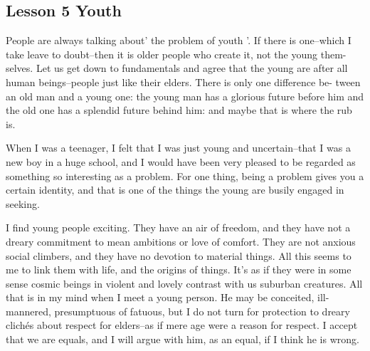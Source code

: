 \documentclass[kindlepaper]{BHCexam4kindle}
\begin{document}
\subsection{Lesson 5
Youth}
\par
People are always talking about' the problem of youth '. If there is one--which
I take leave to doubt--then it is older people who create it, not the young them-
selves. Let us get down to fundamentals and agree that the young are after all
human beings--people just like their elders. There is only one difference be-
tween an old man and a young one: the young man has a glorious future before
him and the old one has a splendid future behind him: and maybe that is where
the rub is.
\par
When I was a teenager, I felt that I was just young and uncertain--that I was
a new boy in a huge school, and I would have been very pleased to be regarded
as something so interesting as a problem. For one thing, being a problem gives
you a certain identity, and that is one of the things the young are busily engaged
in seeking.
\par
I find young people exciting. They have an air of freedom, and they have not a
dreary commitment to mean ambitions or love of comfort. They are not anxious
social climbers, and they have no devotion to material things. All this seems to
me to link them with life, and the origins of things. It's as if they were in some
sense cosmic beings in violent and lovely contrast with us suburban creatures.
All that is in my mind when I meet a young person. He may be conceited, ill-
mannered, presumptuous of fatuous, but I do not turn for protection to dreary
clichés about respect for elders--as if mere age were a reason for respect. I
accept that we are equals, and I will argue with him, as an equal, if I think he
is wrong.

\clearpage
\end{document}
